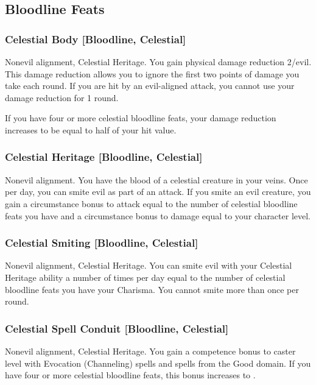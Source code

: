 \subsection{Bloodline Feats}

\subsubsection{Celestial Body [Bloodline, Celestial]}
 Nonevil alignment, Celestial Heritage.
 You gain physical damage reduction 2/evil. This damage reduction allows you to ignore the first two points of damage you take each round. If you are hit by an evil-aligned attack, you cannot use your damage reduction for 1 round.

If you have four or more celestial bloodline feats, your damage reduction increases to be equal to half of your hit value.

\subsubsection{Celestial Heritage [Bloodline, Celestial]}
 Nonevil alignment.
 You have the blood of a celestial creature in your veins. Once per day, you can smite evil as part of an attack. If you smite an evil creature, you gain a circumstance bonus to attack equal to the number of celestial bloodline feats you have and a circumstance bonus to damage equal to your character level.

\subsubsection{Celestial Smiting [Bloodline, Celestial]}
 Nonevil alignment, Celestial Heritage.
 You can smite evil with your Celestial Heritage ability a number of times per day equal to the number of celestial bloodline feats you have \add your Charisma. You cannot smite more than once per round.

\subsubsection{Celestial Spell Conduit [Bloodline, Celestial]}
 Nonevil alignment, Celestial Heritage.
 You gain a  competence bonus to caster level with Evocation (Channeling) spells and spells from the Good domain. If you have four or more celestial bloodline feats, this bonus increases to .


